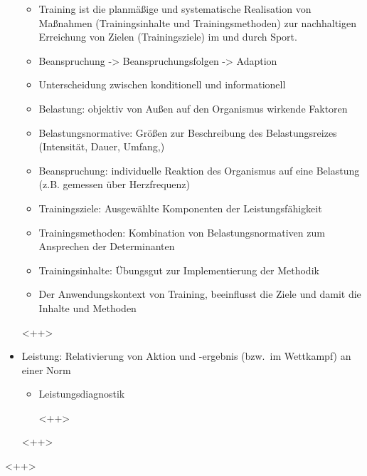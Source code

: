 \begin{itemize}
\begin{itemize}
  \item Training ist die planmäßige und systematische Realisation von Maßnahmen (Trainingsinhalte und Trainingsmethoden) zur nachhaltigen Erreichung von Zielen (Trainingsziele)
im und durch Sport.
  \item Beanspruchung -> Beanspruchungsfolgen -> Adaption \item Unterscheidung zwischen konditionell und informationell
  \item Belastung: objektiv von Außen auf den Organismus wirkende Faktoren
  \item Belastungsnormative: Größen zur Beschreibung des Belastungsreizes (Intensität, Dauer, Umfang,\ellispes)
  \item Beanspruchung: individuelle Reaktion des Organismus auf eine Belastung (z.B. gemessen über Herzfrequenz)
  \item Trainingsziele: Ausgewählte Komponenten der Leistungsfähigkeit
  \item Trainingsmethoden: Kombination von Belastungsnormativen zum Ansprechen der Determinanten
  \item Trainingsinhalte: Übungsgut zur Implementierung der Methodik
  \item Der Anwendungskontext von Training, beeinflusst die Ziele und damit die Inhalte und Methoden
  \end{itemize}<++>
\item Leistung: Relativierung von Aktion und -ergebnis (bzw.\ im Wettkampf) an einer Norm
  \begin{itemize}
  \item Leistungsdiagnostik
    <++>
  \end{itemize}<++>

\end{itemize}<++>
